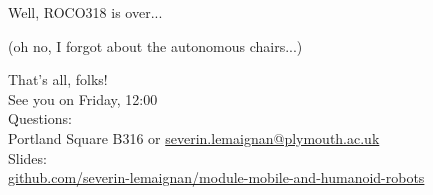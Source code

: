 \documentclass[compress]{beamer}
\begin{document}
\begin{frame}[plain]{}
    Well, ROCO318 is over...

    \pause
    (oh no, I forgot about the autonomous chairs...)
\end{frame}




\begin{frame}{}
    \begin{center}
        \Large
        That's all, folks!\\[2em]
        \normalsize
        See you on Friday, 12:00\\[1em]
        Questions:\\
        Portland Square B316 or \url{severin.lemaignan@plymouth.ac.uk} \\[1em]

        Slides:\\ \href{https://github.com/severin-lemaignan/module-mobile-and-humanoid-robots}{\small github.com/severin-lemaignan/module-mobile-and-humanoid-robots}

    \end{center}
\end{frame}
\end{document}
